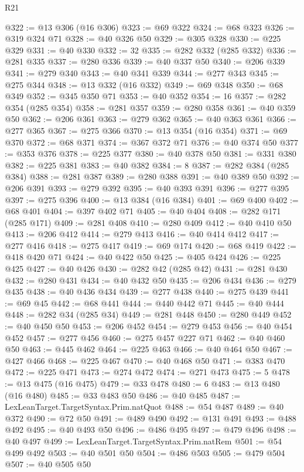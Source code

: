 \begin{lexlean}{R21}
\begin{coremodule}
{{{{{{{{{{{{{{{@322 := @13 @306 (@16 @306)
@323 := @69 @322
@324 := @68 @323
@326 := @319 @324 @71
@328 := @40 @326 @50
@329 := @305 @328
@330 := @225 @329
@331 := @40 @330
@332 := 32
@335 := @282 @332 (@285 @332)
@336 := @281 @335
@337 := @280 @336
@339 := @40 @337 @50
@340 := @206 @339
@341 := @279 @340
@343 := @40 @341 @339
@344 := @277 @343
@345 := @275 @344
@348 := @13 @332 (@16 @332)
@349 := @69 @348
@350 := @68 @349
@352 := @345 @350 @71
@353 := @40 @352
@354 := 16
@357 := @282 @354 (@285 @354)
@358 := @281 @357
@359 := @280 @358
@361 := @40 @359 @50
@362 := @206 @361
@363 := @279 @362
@365 := @40 @363 @361
@366 := @277 @365
@367 := @275 @366
@370 := @13 @354 (@16 @354)
@371 := @69 @370
@372 := @68 @371
@374 := @367 @372 @71
@376 := @40 @374 @50
@377 := @353 @376
@378 := @225 @377
@380 := @40 @378 @50
@381 := @331 @380
@382 := @225 @381
@383 := @40 @382
@384 := 8
@387 := @282 @384 (@285 @384)
@388 := @281 @387
@389 := @280 @388
@391 := @40 @389 @50
@392 := @206 @391
@393 := @279 @392
@395 := @40 @393 @391
@396 := @277 @395
@397 := @275 @396
@400 := @13 @384 (@16 @384)
@401 := @69 @400
@402 := @68 @401
@404 := @397 @402 @71
@405 := @40 @404
@408 := @282 @171 (@285 @171)
@409 := @281 @408
@410 := @280 @409
@412 := @40 @410 @50
@413 := @206 @412
@414 := @279 @413
@416 := @40 @414 @412
@417 := @277 @416
@418 := @275 @417
@419 := @69 @174
@420 := @68 @419
@422 := @418 @420 @71
@424 := @40 @422 @50
@425 := @405 @424
@426 := @225 @425
@427 := @40 @426
@430 := @282 @42 (@285 @42)
@431 := @281 @430
@432 := @280 @431
@434 := @40 @432 @50
@435 := @206 @434
@436 := @279 @435
@438 := @40 @436 @434
@439 := @277 @438
@440 := @275 @439
@441 := @69 @45
@442 := @68 @441
@444 := @440 @442 @71
@445 := @40 @444
@448 := @282 @34 (@285 @34)
@449 := @281 @448
@450 := @280 @449
@452 := @40 @450 @50
@453 := @206 @452
@454 := @279 @453
@456 := @40 @454 @452
@457 := @277 @456
@460 := @275 @457 @227 @71
@462 := @40 @460 @50
@463 := @445 @462
@464 := @225 @463
@466 := @40 @464 @50
@467 := @427 @466
@468 := @225 @467
@470 := @40 @468 @50
@471 := @383 @470
@472 := @225 @471
@473 := @274 @472
@474 := @271 @473
@475 := 5
@478 := @13 @475 (@16 @475)
@479 := @33 @478
@480 := 6
@483 := @13 @480 (@16 @480)
@485 := @33 @483 @50
@486 := @40 @485
@487 := LexLeanTarget.TargetSyntax.Prim.natQuot
@488 := @54 @487
@489 := @40 @372
@490 := @72 @50
@491 := @489 @490
@492 := @131 @491
@493 := @488 @492
@495 := @40 @493 @50
@496 := @486 @495
@497 := @479 @496
@498 := @40 @497
@499 := LexLeanTarget.TargetSyntax.Prim.natRem
@501 := @54 @499 @492
@503 := @40 @501 @50
@504 := @486 @503
@505 := @479 @504
@507 := @40 @505 @50
}}}}}}}}}}}}}}}
\end{coremodule}
\end{lexlean}
